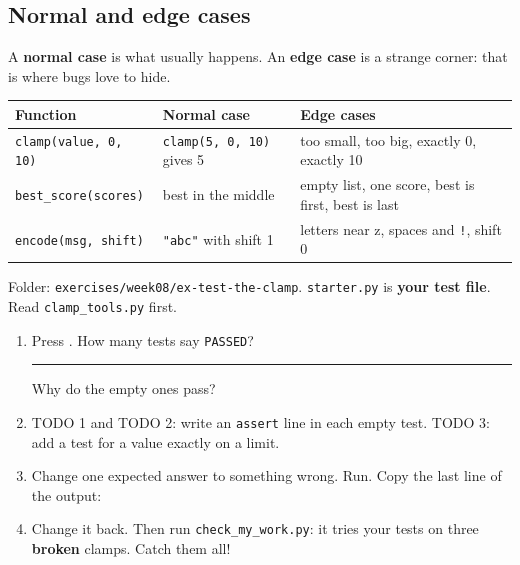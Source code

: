 \subsection{Normal and edge cases}
A \textbf{normal case} is what usually happens. An \textbf{edge case} is a strange corner: that is where bugs love to hide.
\begin{center}
\renewcommand{\arraystretch}{1.3}
\begin{tabular}{@{}>{\raggedright\arraybackslash}p{4.3cm}>{\raggedright\arraybackslash}p{4.0cm}>{\raggedright\arraybackslash}p{6.2cm}@{}}
\toprule
\textbf{Function} & \textbf{Normal case} & \textbf{Edge cases} \\ \midrule
\texttt{clamp(value, 0, 10)} & \texttt{clamp(5, 0, 10)} gives 5 & too small, too big, exactly 0, exactly 10 \\
\texttt{best\_score(scores)} & best in the middle & empty list, one score, best is first, best is last \\
\texttt{encode(msg, shift)} & \texttt{"abc"} with shift 1 & letters near z, spaces and \texttt{!}, shift 0 \\
\bottomrule
\end{tabular}
\end{center}

\begin{exercise}
Folder: \texttt{exercises/week08/ex-test-the-clamp}. \texttt{starter.py} is \textbf{your test file}. Read \texttt{clamp\_tools.py} first.
\begin{enumerate}[leftmargin=1.4em]
  \item Press . How many tests say \texttt{PASSED}? \rule{1.5cm}{0.4pt} Why do the empty ones pass?
  \item TODO 1 and TODO 2: write an \texttt{assert} line in each empty test. TODO 3: add a test for a value exactly on a limit.
  \item Change one expected answer to something wrong. Run. Copy the last line of the output: 
  \item Change it back. Then run \texttt{check\_my\_work.py}: it tries your tests on three \textbf{broken} clamps. Catch them all!
\end{enumerate}
\end{exercise}

